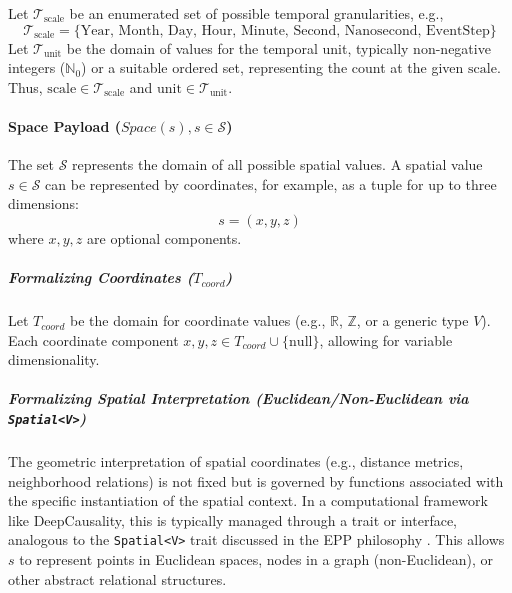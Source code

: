                 Let \(\mathcal{T}_{\text{scale}}\) be an enumerated set of possible temporal granularities, e.g., 
                \[ \mathcal{T}_{\text{scale}} = \{\text{Year, Month, Day, Hour, Minute, Second, Nanosecond, EventStep}\} \]
                Let \(\mathcal{T}_{\text{unit}}\) be the domain of values for the temporal unit, typically non-negative integers (\(\mathbb{N}_0\)) or a suitable ordered set, representing the count at the given \(\text{scale}\).
                Thus, \(\text{scale} \in \mathcal{T}_{\text{scale}}\) and \(\text{unit} \in \mathcal{T}_{\text{unit}}\).


            \paragraph[Space Payload]{Space Payload (\(Space(s), s \in \mathcal{S}\))}\label{par:space_payload}
            
            The set \(\mathcal{S}\) represents the domain of all possible spatial values. A spatial value \(s \in \mathcal{S}\) can be represented by coordinates, for example, as a tuple for up to three dimensions:
            \[ s = (x, y, z) \]
            where \(x, y, z\) are optional components.
            
                \subparagraph[Coordinates]{Formalizing Coordinates (\(T_{coord}\))}
                \label{subpar:coordinates}
                
                Let \(T_{coord}\) be the domain for coordinate values (e.g., \(\mathbb{R}\), \(\mathbb{Z}\), or a generic type \(V\)). Each coordinate component \(x, y, z \in T_{coord} \cup \{\text{null}\}\), allowing for variable dimensionality.
                
                \subparagraph[Spatial Interpretation]{Formalizing Spatial Interpretation (Euclidean/Non-Euclidean via \texttt{Spatial<V>})}
                \label{subpar:spatial_interpretation}
                
                The geometric interpretation of spatial coordinates (e.g., distance metrics, neighborhood relations) is not fixed but is governed by functions associated with the specific instantiation of the spatial context. In a computational framework like DeepCausality, this is typically managed through a trait or interface, analogous to the \texttt{Spatial<V>} trait discussed in the EPP philosophy \cite{Hansen2025EPP}. This allows \(s\) to represent points in Euclidean spaces, nodes in a graph (non-Euclidean), or other abstract relational structures.


